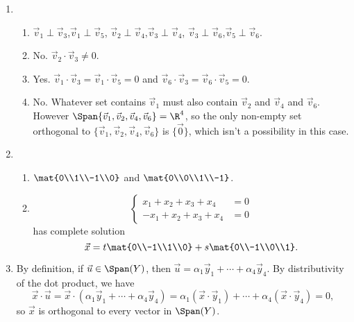
\begin{enumerate}
			\item
			\begin{enumerate}
				\item
				$\vec v_1\perp \vec v_3$,\quad  $\vec v_1\perp \vec v_5$, \quad
				$\vec v_2\perp\vec v_4$,\quad  $\vec v_3\perp \vec v_4$,\quad
				$\vec v_3\perp \vec v_6$,\quad  $\vec v_5\perp \vec v_6$.

				\item No. $\vec v_2\cdot \vec v_3\neq 0$.
				\item Yes. $\vec v_1\cdot \vec v_3=\vec v_1\cdot \vec v_5=0$ and
					$\vec v_6\cdot \vec v_3=\vec v_6\cdot \vec v_5=0$.
				\item No. Whatever set contains $\vec v_1$ must also contain $\vec v_2$ and
					$\vec v_4$ and $\vec v_6$.
					However $\Span\{\vec v_1,\vec v_2,\vec v_4,
					\vec v_6\}=\R^4$, so the only non-empty set orthogonal
					to $\{\vec v_1,\vec v_2,\vec v_4,
					\vec v_6\}$ is $\{\vec 0\}$, which isn't a possibility in this case.
			\end{enumerate}
			\item \begin{enumerate}
					\item $\mat{0\\1\\-1\\0}$ and $\mat{0\\0\\1\\-1}$.
					\item \[
							\begin{cases}x_1+x_2+x_3+x_4&=0\\ -{x_1}+x_2+x_3+x_4&=0\end{cases}
						\]
					has complete solution
					\[
						\vec x = t\mat{0\\-1\\1\\0}+s\mat{0\\-1\\0\\1}.
					\]
			\end{enumerate}

			\item By definition, if $\vec u\in\Span(Y)$, then $\vec u=\alpha_1\vec y_1+\cdots+\alpha_4\vec y_4$.
				By distributivity of the dot product, we have
				\[
					\vec x\cdot \vec u = \vec x\cdot (\alpha_1\vec y_1+\cdots+\alpha_4\vec y_4)
					=\alpha_1(\vec x\cdot \vec y_1)+\cdots +\alpha_4(\vec x\cdot \vec y_4)=0,
				\]
				so $\vec x$ is orthogonal to every vector in $\Span(Y)$.


\end{enumerate}
